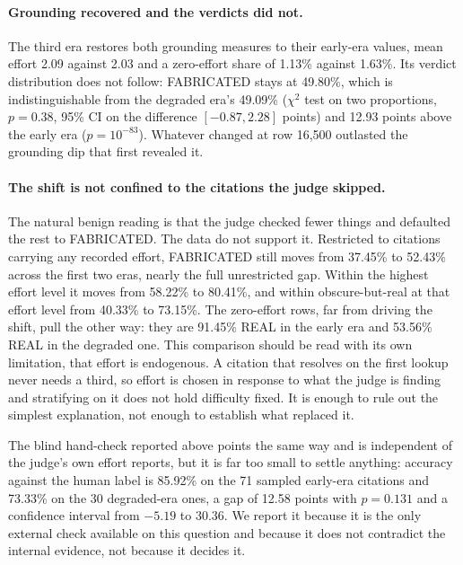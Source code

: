 \paragraph{Grounding recovered and the verdicts did not.}
The third era restores both grounding measures to their early-era values, mean
effort 2.09 against 2.03 and a zero-effort share of 1.13\% against 1.63\%. Its
verdict distribution does not follow: FABRICATED stays at 49.80\%, which is
indistinguishable from the degraded era's 49.09\% ($\chi^2$ test on two
proportions, $p = 0.38$, 95\% CI on the difference $[-0.87, 2.28]$ points) and
12.93 points above the early era ($p = 10^{-83}$). Whatever changed at row
16,500 outlasted the grounding dip that first revealed it.

\paragraph{The shift is not confined to the citations the judge skipped.}
The natural benign reading is that the judge checked fewer things and defaulted
the rest to FABRICATED. The data do not support it. Restricted to citations
carrying any recorded effort, FABRICATED still moves from 37.45\% to 52.43\%
across the first two eras, nearly the full unrestricted gap. Within the highest
effort level it moves from 58.22\% to 80.41\%, and within obscure-but-real at
that effort level from 40.33\% to 73.15\%. The zero-effort rows, far from
driving the shift, pull the other way: they are 91.45\% REAL in the early era
and 53.56\% REAL in the degraded one. This comparison should be read with its
own limitation, that effort is endogenous. A citation that resolves on the first
lookup never needs a third, so effort is chosen in response to what the judge is
finding and stratifying on it does not hold difficulty fixed. It is enough to
rule out the simplest explanation, not enough to establish what replaced it.

The blind hand-check reported above points the same way and is independent of
the judge's own effort reports, but it is far too small to settle anything:
accuracy against the human label is 85.92\% on the 71 sampled
early-era citations and 73.33\% on the 30 degraded-era ones, a gap of 12.58
points with $p = 0.131$ and a confidence interval from $-5.19$ to $30.36$. We
report it because it is the only external check available on this question and
because it does not contradict the internal evidence, not because it decides it.

